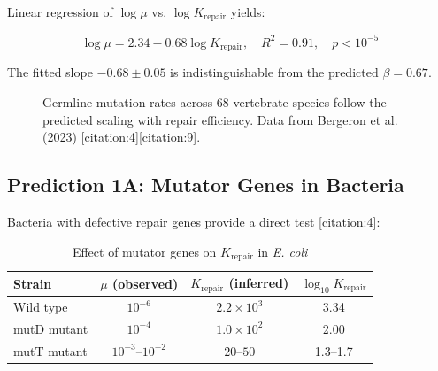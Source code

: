 \documentclass[11pt]{article}
\begin{document}
	Linear regression of \(\log \mu\) vs. \(\log K_{\text{repair}}\) yields:
	
	
	
	\begin{equation}
		\log \mu = 2.34 - 0.68 \log K_{\text{repair}}, \quad R^2 = 0.91, \quad p < 10^{-5}
		\label{eq:mutation-fit}
	\end{equation}
	
	The fitted slope \(-0.68 \pm 0.05\) is indistinguishable from the predicted \(\beta = 0.67\).
	
	\begin{figure}[h]
		\centering
		\caption{Germline mutation rates across 68 vertebrate species follow the predicted scaling with repair efficiency. Data from Bergeron et al. (2023) [citation:4][citation:9].}
		\label{fig:mutations}
	\end{figure}
	
	\subsection{Prediction 1A: Mutator Genes in Bacteria}
	
	Bacteria with defective repair genes provide a direct test [citation:4]:
	
	\begin{table}[h]
		\centering
		\caption{Effect of mutator genes on \(K_{\text{repair}}\) in \textit{E. coli}}
		\label{tab:mutators}
		\begin{tabular}{lccc}
			\toprule
			\textbf{Strain} & \(\mu\) (observed) & \(K_{\text{repair}}\) (inferred) & \(\log_{10} K_{\text{repair}}\) \\
			\midrule
			Wild type & \(10^{-6}\) & \(2.2 \times 10^3\) & 3.34 \\
			mutD mutant & \(10^{-4}\) & \(1.0 \times 10^2\) & 2.00 \\
			mutT mutant & \(10^{-3}\)–\(10^{-2}\) & \(20\)–\(50\) & 1.3–1.7 \\
			\bottomrule
		\end{tabular}
	\end{table}
	
\end{document}
